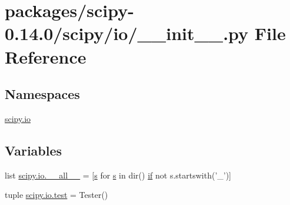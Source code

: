 \hypertarget{packages_2scipy-0_814_80_2scipy_2io_2____init_____8py}{}\section{packages/scipy-\/0.14.0/scipy/io/\+\_\+\+\_\+init\+\_\+\+\_\+.py File Reference}
\label{packages_2scipy-0_814_80_2scipy_2io_2____init_____8py}
\subsection*{Namespaces}
\begin{DoxyCompactItemize}
\item 
 \hyperlink{namespacescipy_1_1io}{scipy.\+io}
\end{DoxyCompactItemize}
\subsection*{Variables}
\begin{DoxyCompactItemize}
\item 
list \hyperlink{namespacescipy_1_1io_a8a30db83c98e4b0529669fa0d23058c1}{scipy.\+io.\+\_\+\+\_\+all\+\_\+\+\_\+} = \mbox{[}\hyperlink{indexexpr_8h_ae024b0db549122b44c349ae28ec990dc}{s} for \hyperlink{indexexpr_8h_ae024b0db549122b44c349ae28ec990dc}{s} in dir() \hyperlink{minmax_8h_a30a0ee9fee303f01d9c5e6f669e0dfe9}{if} not s.\+startswith('\+\_\+')\mbox{]}
\item 
tuple \hyperlink{namespacescipy_1_1io_ad5fbfd6f6d543703dd69dffa57c43063}{scipy.\+io.\+test} = Tester()
\end{DoxyCompactItemize}
